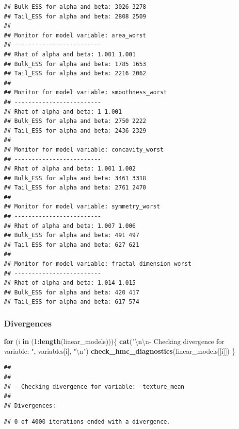\documentclass[
]{article}
\newenvironment{Shaded}{\begin{snugshade}}{\end{snugshade}}
\newcommand{\CharTok}[1]{\textcolor[rgb]{0.31,0.60,0.02}{#1}}
\newcommand{\ControlFlowTok}[1]{\textcolor[rgb]{0.13,0.29,0.53}{\textbf{#1}}}
\newcommand{\DecValTok}[1]{\textcolor[rgb]{0.00,0.00,0.81}{#1}}
\newcommand{\KeywordTok}[1]{\textcolor[rgb]{0.13,0.29,0.53}{\textbf{#1}}}
\newcommand{\NormalTok}[1]{#1}
\newcommand{\OperatorTok}[1]{\textcolor[rgb]{0.81,0.36,0.00}{\textbf{#1}}}
\newcommand{\StringTok}[1]{\textcolor[rgb]{0.31,0.60,0.02}{#1}}
\begin{document}
\begin{verbatim}
## Bulk_ESS for alpha and beta: 3026 3278 
## Tail_ESS for alpha and beta: 2808 2509 
## 
## Monitor for model variable: area_worst 
## -------------------------
## Rhat of alpha and beta: 1.001 1.001 
## Bulk_ESS for alpha and beta: 1785 1653 
## Tail_ESS for alpha and beta: 2216 2062 
## 
## Monitor for model variable: smoothness_worst 
## -------------------------
## Rhat of alpha and beta: 1 1.001 
## Bulk_ESS for alpha and beta: 2750 2222 
## Tail_ESS for alpha and beta: 2436 2329 
## 
## Monitor for model variable: concavity_worst 
## -------------------------
## Rhat of alpha and beta: 1.001 1.002 
## Bulk_ESS for alpha and beta: 3461 3318 
## Tail_ESS for alpha and beta: 2761 2470 
## 
## Monitor for model variable: symmetry_worst 
## -------------------------
## Rhat of alpha and beta: 1.007 1.006 
## Bulk_ESS for alpha and beta: 491 497 
## Tail_ESS for alpha and beta: 627 621 
## 
## Monitor for model variable: fractal_dimension_worst 
## -------------------------
## Rhat of alpha and beta: 1.014 1.015 
## Bulk_ESS for alpha and beta: 420 417 
## Tail_ESS for alpha and beta: 617 574
\end{verbatim}

\hypertarget{divergences}{%
\subsubsection{Divergences}\label{divergences}}

\begin{Shaded}
\begin{Highlighting}[]
\ControlFlowTok{for}\NormalTok{ (i }\ControlFlowTok{in}\NormalTok{ (}\DecValTok{1}\OperatorTok{:}\KeywordTok{length}\NormalTok{(linear_models)))\{}
  \KeywordTok{cat}\NormalTok{(}\StringTok{"}\CharTok{\textbackslash{}n\textbackslash{}n}\StringTok{- Checking divergence for variable: "}\NormalTok{, variables[i], }\StringTok{"}\CharTok{\textbackslash{}n}\StringTok{"}\NormalTok{)}
  \KeywordTok{check_hmc_diagnostics}\NormalTok{(linear_models[[i]])}
\NormalTok{\}}
\end{Highlighting}
\end{Shaded}

\begin{verbatim}
## 
## 
## - Checking divergence for variable:  texture_mean 
## 
## Divergences:
\end{verbatim}

\begin{verbatim}
## 0 of 4000 iterations ended with a divergence.
\end{verbatim}
\end{document}
